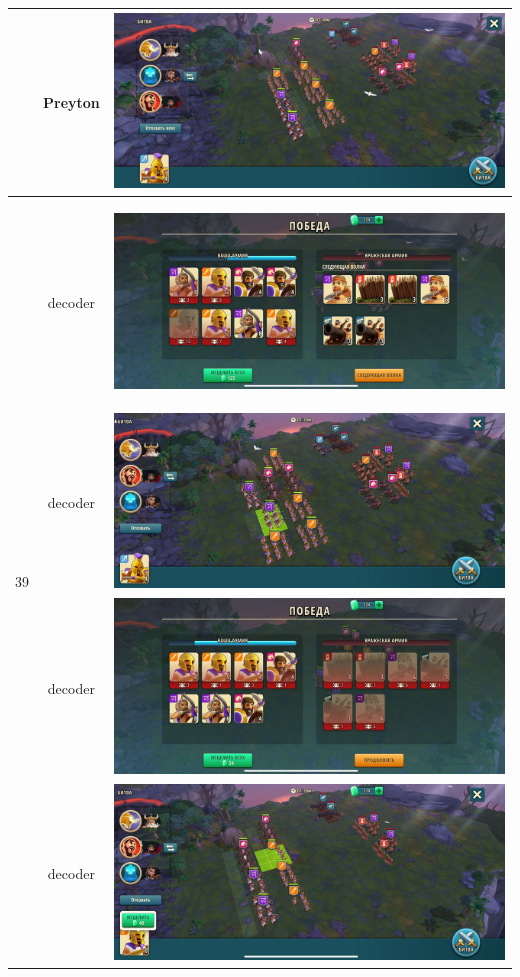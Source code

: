 \begin{longtable}{|c|c|c|}
	& Preyton &
	\includegraphics[width=0.75\linewidth]{./parts/media/TreasureHunt/39/Preyton/39.1.jpg} \\
	\hline
	\multirow{11}{*}{39} & decoder &
	\hypertarget{fight39}{\includegraphics[width=0.75\linewidth]{./parts/media/TreasureHunt/39/decoder/photo_2022-04-07_13-15-36.jpg}} \\
	& decoder &
	\includegraphics[width=0.75\linewidth]{./parts/media/TreasureHunt/39/decoder/photo_2022-04-07_13-15-27.jpg} \\
	& decoder &
	\includegraphics[width=0.75\linewidth]{./parts/media/TreasureHunt/39/decoder/photo_2022-04-07_13-15-43.jpg} \\
	& decoder &
	\includegraphics[width=0.75\linewidth]{./parts/media/TreasureHunt/39/decoder/photo_2022-04-07_13-15-39.jpg} \\

\end{longtable}
